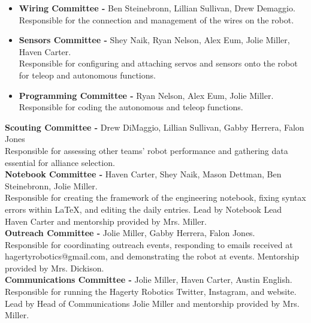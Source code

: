 \documentclass[
letterpaper, %
11pt, %
onecolumn, %
openany, %
]{article}
\begin{document}
\begin{itemize}

\item \textbf{Wiring Committee -} Ben Steinebronn, Lillian Sullivan, Drew Demaggio. \\ 
Responsible for the connection and management of the wires on the robot. 

\item \textbf{Sensors Committee -} Shey Naik, Ryan Nelson, Alex Eum, Jolie Miller, Haven Carter. \\
Responsible for configuring and attaching servos and sensors onto the robot for teleop and autonomous functions. 

\item \textbf{Programming Committee -} Ryan Nelson, Alex Eum, Jolie Miller. \\ Responsible for coding the autonomous and teleop functions. 

\end{itemize} 

\noindent\textbf{\Large Scouting Committee -} Drew DiMaggio, Lillian Sullivan, Gabby Herrera, Falon Jones \\
Responsible for assessing other teams' robot performance and gathering data essential for alliance selection. \\
\newline\noindent\textbf{\Large Notebook Committee -} Haven Carter, Shey Naik, Mason Dettman, Ben Steinebronn, Jolie Miller.  \\
Responsible for creating the framework of the engineering notebook, fixing syntax errors within \LaTeX, and editing the daily entries. Lead by Notebook Lead Haven Carter and mentorship provided by Mrs. Miller. \\
\newline\noindent\textbf{\Large Outreach Committee -} Jolie Miller, Gabby Herrera, Falon Jones.  \\
Responsible for coordinating outreach events, responding to emails received at hagertyrobotics@gmail.com, and demonstrating the robot at events. Mentorship provided by Mrs. Dickison. \\
\newline\noindent\textbf{\Large Communications Committee -} Jolie Miller, Haven Carter, Austin English.  \\
Responsible for running the Hagerty Robotics Twitter, Instagram, and website. Lead by Head of Communications Jolie Miller and mentorship provided by Mrs. Miller. \\
\end{document}
